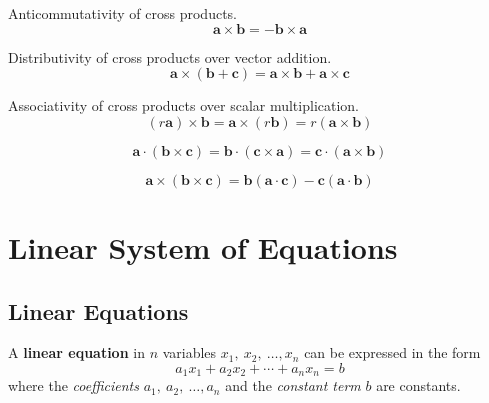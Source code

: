 \documentclass{article}
\begin{document}
\begin{theorem}
    Anticommutativity of cross products.
    \begin{equation*}
        \symbf{a}\times \symbf{b} = -\symbf{b}\times \symbf{a}
    \end{equation*}
\end{theorem}
\begin{theorem}
    Distributivity of cross products over vector addition.
    \begin{equation*}
        \symbf{a}\times\left( \symbf{b}+\symbf{c} \right) = \symbf{a}\times\symbf{b} + \symbf{a}\times\symbf{c}
    \end{equation*}
\end{theorem}
\begin{theorem}
    Associativity of cross products over scalar multiplication.
    \begin{equation*}
        \left( r \symbf{a}\right)\times\symbf{b} = \symbf{a}\times\left( r \symbf{b} \right) = r\left(\symbf{a}\times\symbf{b}\right)
    \end{equation*}
\end{theorem}
\begin{theorem}
    \begin{equation*}
        \symbf{a} \cdot \left(\symbf{b}\times\symbf{c}\right) = \symbf{b} \cdot \left(\symbf{c}\times\symbf{a}\right) = \symbf{c} \cdot \left(\symbf{a}\times\symbf{b}\right)
    \end{equation*}
\end{theorem}
\begin{theorem}
    \begin{equation*}
        \symbf{a} \times \left(\symbf{b}\times\symbf{c}\right) = \symbf{b} \left(\symbf{a}\cdot\symbf{c}\right) - \symbf{c}\left(\symbf{a}\cdot\symbf{b}\right)
    \end{equation*}
\end{theorem}
\section{Linear System of Equations}
\subsection{Linear Equations}
\begin{definition}
    A \textbf{linear equation} in \(n\) variables
    \(x_1,\: x_2,\: \dots, x_n\) can be expressed in the form
    \begin{equation*}
        a_{1}x_1 + a_{2}x_2 + \cdots + a_{n}x_n = b
    \end{equation*}
    where the \textit{coefficients} \(a_1,\: a_2,\: \dots, a_n\) and the
    \textit{constant term} \(b\) are constants.
\end{definition}
\end{document}

